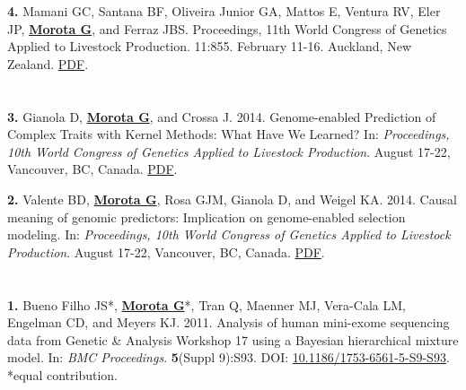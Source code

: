 \documentclass[margin,line,10pt]{res}
\newenvironment{list1}{
  \begin{list}{\ding{113}}{%
      \setlength{\itemsep}{0in}
      \setlength{\parsep}{0in} \setlength{\parskip}{0in}
      \setlength{\topsep}{0in} \setlength{\partopsep}{0in} 
      \setlength{\leftmargin}{0.17in}}}{\end{list}}
\begin{document}
\begin{resume}
\begin{list1}
  \vspace{0.5cm}
  
\item [\bf{4}.] Mamani GC, Santana BF, Oliveira Junior GA, Mattos E, Ventura RV, Eler JP, {\bf \underline{Morota G}}, and Ferraz JBS. Proceedings, 11th World Congress of Genetics Applied to Livestock Production. 11:855. February 11-16. Auckland, New Zealand. \textcolor{blue}{\href{http://www.wcgalp.org/proceedings/2018/effect-inbreeding-productive-traits-nellore-cattle}{PDF}}.  

  
\end{list1}

\section{}
\begin{list1}
\item [\bf{3}.] Gianola D, {\bf \underline{Morota G}}, and Crossa J. 2014. 
Genome-enabled Prediction of Complex Traits with Kernel Methods: What Have We Learned? In: \emph{Proceedings, 10th World Congress of Genetics Applied to Livestock Production}. August 17-22, Vancouver, BC, Canada. 
\textcolor{blue}{\href{http://www.morotalab.org/publications/pdf/gianola2014WCGALP.pdf}{PDF}}.  


\vspace{0.5cm}

\item [\bf{2}.] Valente BD, {\bf \underline{Morota G}}, Rosa GJM, Gianola D, and  Weigel KA. 2014. 
Causal meaning of genomic predictors: Implication on genome-enabled selection modeling. In: \emph{Proceedings, 10th World Congress of Genetics Applied to Livestock Production}. August 17-22, Vancouver, BC, Canada. 
\textcolor{blue}{\href{http://www.morotalab.org/publications/pdf/valente2014WCGALP.pdf}{PDF}}.  
\end{list1}

\section{}
\begin{list1}
\item [\bf{1}.] Bueno Filho JS*, {\bf \underline{Morota G}}*, Tran Q, Maenner MJ, Vera-Cala LM, Engelman CD, and Meyers KJ. 2011. Analysis of human mini-exome sequencing data from Genetic \& Analysis Workshop 17 using a  Bayesian hierarchical mixture model. In: \emph{BMC Proceedings}. {\bf 5}(Suppl 9):S93. DOI: \textcolor{blue}{\href{http://dx.doi.org/10.1186/1753-6561-5-S9-S93}{10.1186/1753-6561-5-S9-S93}}. *equal contribution.   
\end{list1}







\end{resume}
\end{document}
